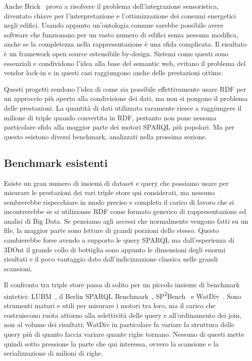 \par Anche Brick~\cite{balaji2018brick} prova a risolvere il problema dell'integrazione sensoristica, diventato chiave per l'interpretazione
e l'ottimizzazione dei consumi energetici negli edifici. Usando appunto un'ontologia comune sarebbe possibile avere software
che funzionano per un vasto numero di edifici senza nessuna modifica, anche se la completezza nella rappresentazione
è una sfida complicata. Il risultato è un framework open source estensibile by-design. 
Sistemi come questi sono essenziali e condividono l'idea alla base del semantic web, evitano il problema del vendor lock-in
e in questi casi raggiungono anche delle prestazioni ottime.

\par Questi progetti rendono l'idea di come sia possibile effettivamente usare RDF per un approccio più aperto alla condivisione
dei dati, ma non si pongono il problema delle prestazioni. La quantità di dati utilizzata raramente riesce
a raggiungere il milione di triple quando convertita in RDF, pertanto non pone nessuna particolare sfida alla maggior parte
dei motori SPARQL più popolari. Ma per questo esistono diversi benchmark, analizzati nella prossima sezione.

\subsection{Benchmark esistenti}

Esiste un gran numero di insiemi di dataset e query che possiamo usare per misurare le prestazioni dei vari
triple store qui considerati, ma nessuno sembrerebbe rispecchiare in modo preciso e completo il carico di lavoro che si
incontrerebbe se si utilizzasse RDF come formato generico di rappresentazione ed analisi di Big Data. Se pensiamo agli accessi 
che normalmente vengono fatti su un file, la maggior parte sono letture di grandi porzioni dello stesso. 
Questo cambierebbe forse avendo a supporto le query SPARQL ma dall'esperienza di 3DOnt il grande collo di bottiglia sono appunto 
le dimensioni degli enormi risultati e il poco vantaggio dato dall'indicizzazione classica nelle grandi scansioni. 

\par Il confronto tra triple store passa di solito per un piccolo insieme di benchmark sintetici: LUBM~\cite{guo2005lubm},
il Berlin SPARQL Benchmark~\cite{bizer2009bsbm}, SP\textsuperscript{2}Bench~\cite{schmidt2009sp2bench} e
WatDiv~\cite{aluc2014watdiv}. Sono strumenti maturi e utili per misurare i motori tra loro, ma il carico che costruiscono
ruota attorno alla selettività delle query e all'ordinamento dei join, non al volume dei risultati; WatDiv in particolare
fa variare la struttura delle query più di quanto faccia variare quante righe tornano. Nessuno di questi mette quindi sotto
pressione la parte che qui interessa, ovvero la scansione e la serializzazione di milioni di righe.

